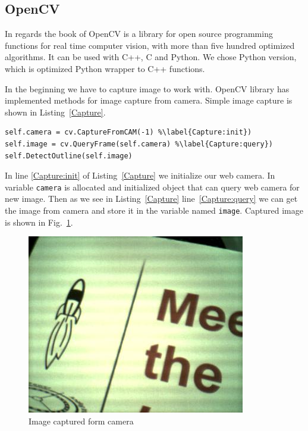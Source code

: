 \documentclass{ifacconf}
\begin{document}
\subsection{OpenCV}
In regards the book of \cite{OpenCV} OpenCV  is a library for open source
programming functions for real time computer vision, with more than five hundred
optimized algorithms. It can be used with C++, C and Python. We chose Python
version, which is optimized Python wrapper to C++ functions.

In the beginning we have to capture image to work with. OpenCV library has
implemented methods for image capture from camera. Simple image capture is shown
in Listing~\ref{Capture}.

\begin{lstlisting}[caption=Query image frame from web camera, label=Capture]
self.camera = cv.CaptureFromCAM(-1) %\label{Capture:init})
self.image = cv.QueryFrame(self.camera) %\label{Capture:query})
self.DetectOutline(self.image)
\end{lstlisting}

In line \ref{Capture:init} of Listing~\ref{Capture} we initialize our web
camera. In variable \lstinline{camera} is allocated and initialized object that
can query web camera for new image. Then as we see in Listing~\ref{Capture}
line~\ref{Capture:query} we can get the image from camera and store it in the
variable named \lstinline{image}. Captured image is shown in
Fig.~\ref{fig:captured}.

\begin{figure}[h]
\center
\includegraphics[width=0.8\columnwidth]{images/1test.png}
\caption{Image captured form camera}
\label{fig:captured}
\end{figure}
\end{document}
